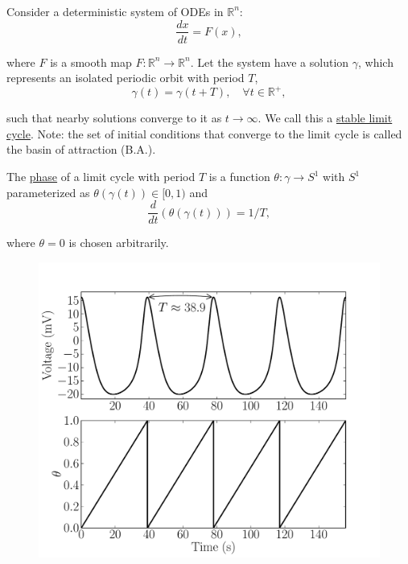 \documentclass{beamer}
\begin{document}
\begin{frame}
\frametitle{\insertsection}
  \framesubtitle{\insertsubsection}
  Consider a deterministic system of ODEs in $\mathbb{R}^n$:
  \begin{equation}
  \frac{dx}{dt} = F(x),
  \end{equation}

  where $F$ is a smooth map $F:\mathbb{R}^n \rightarrow \mathbb{R}^n$. Let the system have a solution $\gamma$, which represents an isolated periodic orbit with period $T$,
  \begin{equation}
  \gamma(t) = \gamma(t+T), \quad \forall t \in \mathbb{R}^+,
  \end{equation}

  such that nearby solutions converge to it as $t \rightarrow \infty$.  We call this a \underline{stable limit cycle}.  Note: the set of initial conditions that converge to the limit cycle is called the basin of attraction (B.A.).
\end{frame}


\begin{frame}

  \begin{definition} The \underline{phase} of a limit cycle with period $T$ is a function $\theta: \gamma \rightarrow S^1$ with $S^1$ parameterized as $\theta(\gamma(t)) \in [0,1)$ and
  \begin{equation}
  \frac{d }{dt}\left (\theta(\gamma(t)) \right ) = 1/T,
  \end{equation}
  \end{definition}
  where $\theta = 0$ is chosen arbitrarily.
\end{frame}

\begin{frame}
   \begin{figure}
   \includegraphics[width=\textwidth]{dthetadt_fig.pdf}
  \end{figure}
\end{frame}
\end{document}
